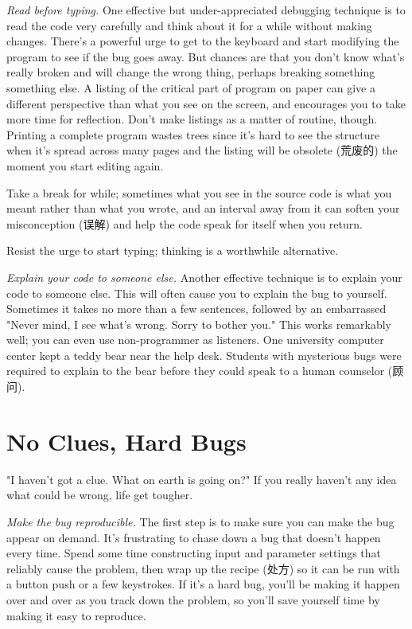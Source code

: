 \emph{Read before typing.} One effective but under-appreciated debugging
technique is to read the code very carefully and think about it for a while
without making changes. There's a powerful urge to get to the keyboard and
start modifying the program to see if the bug goes away. But chances are
that you don't know what's really broken and will change the wrong thing,
perhaps breaking something something else. A listing of the critical part
of program on paper can give a different perspective than what you see on
the screen, and encourages you to take more time for reflection. Don't make
listings as a matter of routine, though. Printing a complete program wastes
trees since it's hard to see the structure when it's spread across many
pages and the listing will be obsolete (荒废的) the moment you start
editing again.

Take a break for while; sometimes what you see in the source code is what
you meant rather than what you wrote, and an interval away from it can
soften your misconception (误解) and help the code speak for itself when
you return.

Resist the urge to start typing; thinking is a worthwhile alternative.

\emph{Explain your code to someone else.} Another effective technique is to
explain your code to someone else. This will often cause you to explain the
bug to yourself. Sometimes it takes no more than a few sentences, followed
by an embarrassed "Never mind, I see what's wrong. Sorry to bother you."
This works remarkably well; you can even use non-programmer as listeners.
One university computer center kept a teddy bear near the help desk.
Students with mysterious bugs were required to explain to the bear before
they could speak to a human counselor (顾问).

\section{No Clues, Hard Bugs}
"I haven't got a clue. What on earth is going on?" If you really haven't
any idea what could be wrong, life get tougher.

\emph{Make the bug reproducible.} The first step is to make sure you can
make the bug appear on demand. It's frustrating to chase down a bug that
doesn't happen every time. Spend some time constructing input and parameter
settings that reliably cause the problem, then wrap up the recipe (处方) so
it can be run with a button push or a few keystrokes. If it's a hard bug,
you'll be making it happen over and over as you track down the problem, so
you'll save yourself time by making it easy to reproduce.

